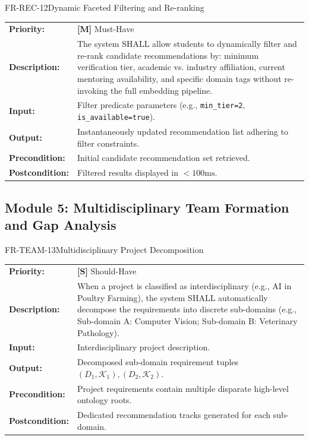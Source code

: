 \documentclass[11pt,a4paper]{article}
\begin{document}
\begin{reqbox}{FR-REC-12}{Dynamic Faceted Filtering and Re-ranking}
\begin{tabularx}{\textwidth}{@{}lX@{}}
\textbf{Priority:} & \textbf{[M]} Must-Have \\
\textbf{Description:} & The system SHALL allow students to dynamically filter and re-rank candidate recommendations by: minimum verification tier, academic vs. industry affiliation, current mentoring availability, and specific domain tags without re-invoking the full embedding pipeline. \\
\textbf{Input:} & Filter predicate parameters (e.g., \texttt{min\_tier=2}, \texttt{is\_available=true}). \\
\textbf{Output:} & Instantaneously updated recommendation list adhering to filter constraints. \\
\textbf{Precondition:} & Initial candidate recommendation set retrieved. \\
\textbf{Postcondition:} & Filtered results displayed in $< 100\text{ms}$. \\
\end{tabularx}
\end{reqbox}

\subsection{Module 5: Multidisciplinary Team Formation and Gap Analysis}

\begin{reqbox}{FR-TEAM-13}{Multidisciplinary Project Decomposition}
\begin{tabularx}{\textwidth}{@{}lX@{}}
\textbf{Priority:} & \textbf{[S]} Should-Have \\
\textbf{Description:} & When a project is classified as interdisciplinary (e.g., AI in Poultry Farming), the system SHALL automatically decompose the requirements into discrete sub-domains (e.g., Sub-domain A: Computer Vision; Sub-domain B: Veterinary Pathology). \\
\textbf{Input:} & Interdisciplinary project description. \\
\textbf{Output:} & Decomposed sub-domain requirement tuples $(D_1, \mathcal{K}_1), (D_2, \mathcal{K}_2)$. \\
\textbf{Precondition:} & Project requirements contain multiple disparate high-level ontology roots. \\
\textbf{Postcondition:} & Dedicated recommendation tracks generated for each sub-domain. \\
\end{tabularx}
\end{reqbox}
\end{document}
